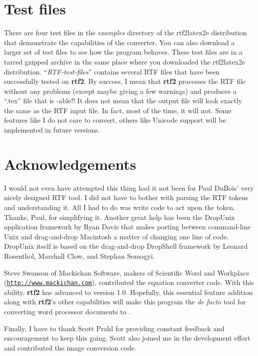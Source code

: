 \documentclass[11pt]{article}
\def\rtf2latex2e{{\bf rtf2\LaTeXe}}
\def\urlone#1{\mbox{\href{#1}{\tt #1}}}
\begin{document}
\section{Test files \label{test}}
There are four test files in the \textit{examples} directory of
the rtf2latex2e distribution that demonstrate the capabilities
of the converter. You can also download a larger set of test files
to see how the program behaves.  These test files are in a tarred
gzipped archive in the same place where you downloaded the rtf2latex2e
distribution.  ``{\em RTF-test-files}'' contains several
RTF files that have been successfully tested on \rtf2latex2e.  By
success, I mean that \rtf2latex2e processes the RTF file without any
problems (except maybe giving a few warnings) and produces a ``.tex''
file that is \LaTeXe-able!!  It does not mean that the {\LaTeXe} output
file will look exactly the same as the RTF input file.  In fact, most
of the time, it will not.  Some features like I do not care to
convert, others like Unicode support will be implemented in future
versions.


\section{Acknowledgements}
I would not even have attempted this thing had it not been for Paul
DuBois' very nicely designed RTF tool.  I did not have to bother with
parsing the RTF tokens and understanding it.  All I had to do was
write code to act upon the token.  Thanks, Paul, for simplifying it. 
Another great help has been the DropUnix application framework by Ryan
Davis that makes porting between command-line Unix and drag-and-drop
Macintosh a matter of changing one line of code.  DropUnix itself is
based on the drag-and-drop DropShell framework by Leonard Rosenthol,
Marshall Clow, and Stephan Somogyi.

Steve Swanson of Mackichan Software, makers of Scientific Word and
Workplace (\urlone{http://www.mackichan.com}), contributed the
equation converter code. With this ability, \rtf2latex2e has
advanced to version 1.0. Hopefully, this essential feature addition
along with \rtf2latex2e's other capabilities will make this program
the \textit{de facto} tool for converting word processor documents
to \LaTeXe.

Finally, I have to thank Scott Prahl for providing constant feedback
and encouragement to keep this going.  Scott also joined me in the
development effort and contributed the image conversion code.
\end{document}
